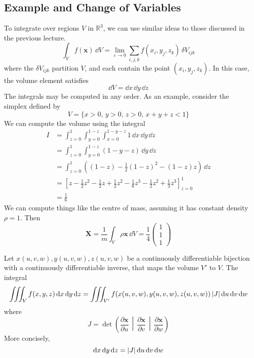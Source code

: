 \documentclass{article}
\begin{document}
\subsection{Example and Change of Variables}
To integrate over regions $V$ in $\mathbb R^3$, we can use similar ideas to those discussed in the previous lecture.
\[ \int_V f(\bm x) \,\dd V = \lim_{\varepsilon \to 0} \sum_{i,j,k} f(x_i, y_j, z_k) \,\delta V_{ijk} \]
where the $\delta V_{ijk}$ partition $V$, and each contain the point $(x_i, y_j, z_k)$. In this case, the volume element satisfies
\[ \dd V = \dd x\,\dd y\,\dd z \]
The integrals may be computed in any order. As an example, consider the simplex defined by
\[ V = \{ x > 0,\, y > 0,\, z > 0,\, x+y+z < 1 \} \]
We can compute the volume using the integral
\begin{align*}
    I & = \int_{z=0}^1 \int_{y=0}^{1-z} \int_{x=0}^{1-y-z} 1 \,\dd x\,\dd y\,\dd z                                                     \\
      & = \int_{z=0}^1 \int_{y=0}^{1-z} (1-y-z)\,\dd y\,\dd z                                                                          \\
      & = \int_{z=0}^1 \left((1-z) - \frac{1}{2}(1-z)^2 - (1-z)z\right) \,\dd z                                                        \\
      & = \left[ z - \frac{1}{2}z^2 - \frac{1}{2}z + \frac{1}{2}z^2 - \frac{1}{6}z^3 - \frac{1}{2}z^2 + \frac{1}{3}z^3 \right]_{z=0}^1 \\
      & = \frac{1}{6}
\end{align*}
We can compute things like the centre of mass, assuming it has constant density $\rho = 1$. Then
\[ \bm X = \frac{1}{m} \int_V \rho \bm x \,\dd V = \frac{1}{4}\begin{pmatrix}
        1 \\1\\1
    \end{pmatrix} \]
\begin{proposition}
    Let $x(u, v, w), y(u, v, w), z(u, v, w)$ be a continuously differentiable bijection with a continuously differentiable inverse, that maps the volume $V'$ to $V$. The integral
    \[ \iiint_V f(x, y, z)\,\dd x\,\dd y\,\dd z = \iiint_{V'} f(x(u, v, w), y(u, v, w), z(u, v, w))\,\abs{J}\,\dd u\,\dd v\,\dd w \]
    where
    \[ J = \det\left( \frac{\partial \bm x}{\partial u} \,\middle|\, \frac{\partial \bm x}{\partial v} \,\middle|\, \frac{\partial \bm x}{\partial w} \right) \]
    More concisely,
    \[ \dd x\,\dd y\,\dd z = \abs{J}\,\dd u\,\dd v\,\dd w \]
\end{proposition}
\end{document}
